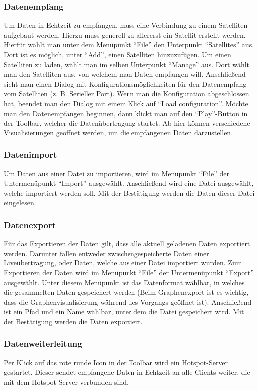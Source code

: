 \subsubsection{Datenempfang}
Um Daten in Echtzeit zu empfangen, muss eine Verbindung zu einem Satelliten aufgebaut werden. Hierzu muss generell zu allererst ein Satellit erstellt werden. Hierfür wählt man unter dem Menüpunkt ``File'' den Unterpunkt ``Satellites'' aus. Dort ist es möglich, unter ``Add'', einen Satelliten hinzuzufügen. Um einen Satelliten zu laden, wählt man im selben Unterpunkt ``Manage'' aus. Dort wählt man den Satelliten aus, von welchem man Daten empfangen will. Anschließend sieht man einen Dialog mit Konfigurationsmöglichkeiten für den Datenempfang vom Satelliten (z. B. Serieller Port). Wenn man die Konfiguration abgeschlossen hat, beendet man den Dialog mit einem Klick auf ``Load configuration''. 
Möchte man den Datenempfangen beginnen, dann klickt man auf den ``Play''-Button in der Toolbar, welcher die Datenübertragung startet. Ab hier können verschiedene Visualisierungen geöffnet werden, um die empfangenen Daten darzustellen.
\subsubsection{Datenimport}
Um Daten aus einer Datei zu importieren, wird im Menüpunkt ``File'' der Untermenüpunkt ``Import'' ausgewählt. Anschließend wird eine Datei ausgewählt, welche importiert werden soll. Mit der Bestätigung werden die Daten dieser Datei eingelesen.
\subsubsection{Datenexport}
Für das Exportieren der Daten gilt, dass alle aktuell geladenen Daten exportiert werden. Darunter fallen entweder zwischengespeicherte Daten einer Liveübertragung, oder Daten, welche aus einer Datei importiert wurden.
Zum Exportieren der Daten wird im Menüpunkt ``File'' der Untermenüpunkt ``Export'' ausgewählt. Unter diesem Menüpunkt ist das Datenformat wählbar, in welches die gesammelten Daten gespeichert werden (Beim Graphenexport ist es wichtig, dass die Graphenvisualisierung während des Vorgangs geöffnet ist). Anschließend ist ein Pfad und ein Name wählbar, unter dem die Datei gespeichert wird. Mit der Bestätigung werden die Daten exportiert.
\subsubsection{Datenweiterleitung}
Per Klick auf das rote runde Icon in der Toolbar wird ein Hotspot-Server gestartet. Dieser sendet empfangene Daten in Echtzeit an alle Clients weiter, die mit dem Hotspot-Server verbunden sind.
